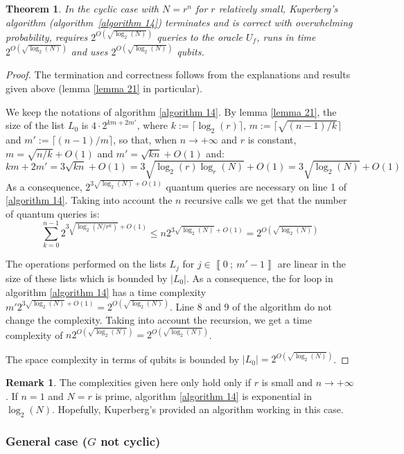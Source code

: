 \documentclass[a4paper,10pt]{report}
\theoremstyle{definition}
\theoremstyle{plain}
\newtheorem{theorem}[definition]{Theorem}
\theoremstyle{definition}
\newtheorem{remark}[definition]{Remark}
\renewcommand{\i}[2]{\left\llbracket #1~;~#2\right\rrbracket}
\renewcommand{\(}{\left(}
\renewcommand{\)}{\right)}
\begin{document}
\begin{theorem}
In the cyclic case with $N=r^n$ for $r$ relatively small, Kuperberg's algorithm (algorithm~\ref{algorithm 14}) terminates and is correct with overwhelming probability, requires $2^{O(\sqrt{\log_2(N)})}$ queries to the oracle $U_f$, runs in time $2^{O(\sqrt{\log_2(N)})}$ and uses $2^{O(\sqrt{\log_2(N)})}$ qubits.
\end{theorem}

\begin{proof}
The termination and correctness follows from the explanations and results given above (lemma \ref{lemma 21} in particular).

We keep the notations of algorithm \ref{algorithm 14}. By lemma \ref{lemma  21}, the size of the list $L_0$ is $4\cdot 2^{km+2m'}$, where $k:=\lceil\log_2(r)\rceil$, $m:=\lceil \sqrt{(n-1)/k}\rceil$ and $m':=\lceil (n-1)/m\rceil$, so that, when $n\rightarrow+\infty$ and $r$ is constant, $m=\sqrt{n/k}+O(1)$ and $m'=\sqrt{kn}+O(1)$ and: 
\[km+2m'=3\sqrt{kn}+O(1)=3\sqrt{\log_2(r)\log_r(N)}+O(1)=3\sqrt{\log_2(N)}+O(1)\]
As a consequence, $2^{3\sqrt{\log_2(N)}+O(1)}$ quantum queries are necessary on line 1 of \ref{algorithm 14}. Taking into account the $n$ recursive calls we get that the number of quantum queries is:
\[\sum_{k=0}^{n-1}2^{3\sqrt{\log_2(N/r^k)}+O(1)}\leq n2^{3\sqrt{\log_2(N)}+O(1)}=2^{O(\sqrt{\log_2(N)})}\]

The operations performed on the lists $L_j$ for $j\in\i{0}{m'-1}$ are linear in the size of these lists which is bounded by $|L_0|$. As a consequence, the for loop in algorithm \ref{algorithm 14} has a time complexity $m'2^{3\sqrt{\log_2(N)}+O(1)}=2^{O(\sqrt{\log_2(N)})}$. Line 8 and 9 of the algorithm do not change the complexity. Taking into account the recursion, we get a time complexity of $n2^{O(\sqrt{\log_2(N)})}=2^{O(\sqrt{\log_2(N)})}$.

The space complexity in terms of qubits is bounded by $|L_0|=2^{O(\sqrt{\log_2(N)})}$.
\end{proof}

\begin{remark}
The complexities given here only hold only if $r$ is small and $n\rightarrow +\infty$. If $n=1$ and $N=r$ is prime, algorithm \ref{algorithm 14} is exponential in $\log_2(N)$.  Hopefully, Kuperberg's provided an algorithm working in this case.
\end{remark}

\subsubsection{General case ($G$ not cyclic)}
\end{document}
